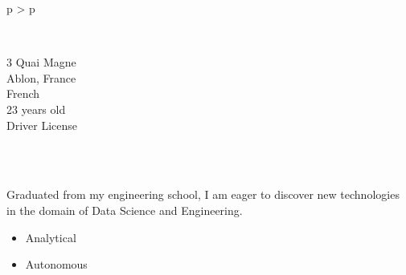 \documentclass[cv]{cv_style}
\begin{document}
{
\begin{tabular}{p{\leftsize\textwidth} > {\arraybackslash}p{\rightsize\textwidth}}
    \textsize
    \begin{minipage}[t]{\leftsize\textwidth}

   
	

        \small
        \vspace{-0.5cm}
        \vspace{-0.65cm}\\
        \begin{flushright}
            3 Quai Magne \\
            Ablon, France \\
            French \\
            23 years old \\
            Driver License
        \end{flushright}
        \vspace{1.5cm}\\
        
        \vspace{-0.65cm}\\
        \begin{justify}   
            Graduated from my engineering school,  
            I am eager to discover new technologies in the domain of Data Science and Engineering.
        \end{justify}
        
        \vspace{0.8cm} 
        \begin{flushleft}
            \begin{itemize}
                \item[\ding{111}]  Analytical
                \item[\ding{111}]  Autonomous 
            \end{itemize}
        \end{flushleft}
        \vspace{1.25cm} 
        \vspace{1.8cm} 


\end{minipage}
\end{tabular}}
\end{document}
